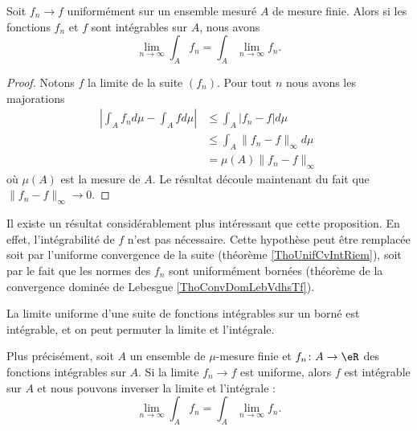 \begin{proposition}       \label{PropbhKnth}
    Soit \( f_n\to f\) uniformément sur un ensemble mesuré \( A\) de mesure finie. Alors si les fonctions \( f_n\) et \( f\) sont intégrables sur \( A\), nous avons
    \begin{equation}
        \lim_{n\to \infty} \int_A f_n=\int_A \lim_{n\to \infty} f_n.
    \end{equation}
\end{proposition}

\begin{proof}
    Notons \( f\) la limite de la suite \( (f_n)\). Pour tout \( n\) nous avons les majorations
    \begin{subequations}
        \begin{align}
            \left| \int_A f_n d\mu-\int_A fd\mu \right| &\leq \int_A| f_n-f |d\mu\\
            &\leq \int_A \| f_n-f \|_{\infty}d\mu\\
            &=\mu(A)\| f_n-f \|_{\infty}
        \end{align}
    \end{subequations}
    où \( \mu(A)\) est la mesure de \( A\). Le résultat découle maintenant du fait que \( \| f_n-f \|_{\infty}\to 0\).
\end{proof}
Il existe un résultat considérablement plus intéressant que cette proposition. En effet, l'intégrabilité de \( f\) n'est pas nécessaire. Cette hypothèse peut être remplacée soit par l'uniforme convergence de la suite (théorème \ref{ThoUnifCvIntRiem}), soit par le fait que les normes des \( f_n\) sont uniformément bornées (théorème de la convergence dominée de Lebesgue \ref{ThoConvDomLebVdhsTf}).

\begin{theorem}			\label{ThoUnifCvIntRiem}
    La limite uniforme d'une suite de fonctions intégrables sur un borné est intégrable, et on peut permuter la limite et l'intégrale. 
    
    Plus précisément, soit \( A\) un ensemble de \( \mu\)-mesure finie et \( f_n\colon A\to \eR\) des fonctions intégrables sur \( A\). Si la limite \( f_n\to f\) est uniforme, alors \( f\) est intégrable sur \( A\) et nous pouvons inverser la limite et l'intégrale :
    \begin{equation}
        \lim_{n\to \infty} \int_A f_n=\int_A\lim_{n\to \infty} f_n.
    \end{equation}
\end{theorem}

